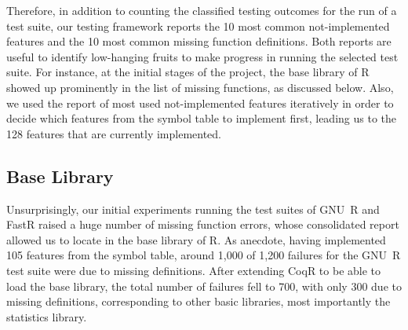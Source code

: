 \documentclass[
    sigplan,
    10pt,
    review, %
    natbib=false %
 ]{acmart}
\newcommand\et[1]{\todo[color=blue!20,size=\scriptsize]{#1}}
\newcommand\td[1]{\todo[color=green!20,size=\scriptsize]{#1}}
\newcommand\CoqR{CoqR}
\begin{document}
Therefore, in addition to counting the classified testing outcomes for the run of a test suite, our testing framework reports the 10 most common not-implemented features and the 10 most common missing function definitions. Both reports are useful to identify low-hanging fruits to make progress in running the selected test suite. For instance, at the initial stages of the project, the base library of R showed up prominently in the list of missing functions, as discussed below.
Also, we used the report of most used not-implemented features iteratively in order to decide which features from the symbol table to implement first, leading us to the 128 features that are currently implemented.
%





\subsection{Base Library}
\label{sec:library}





Unsurprisingly, our initial experiments running the test suites of GNU~R and FastR raised a huge number of missing function errors, whose consolidated report allowed us to locate in the base library of R. As anecdote, having implemented 105 features from the symbol table, around 1,000 of 1,200 failures
for the GNU~R test suite were due to missing definitions.
After extending \CoqR{} to be able to load the base library, the total number of failures fell to 700, with only 300 due to missing definitions, corresponding to other basic libraries, most importantly the statistics library.
\end{document}
